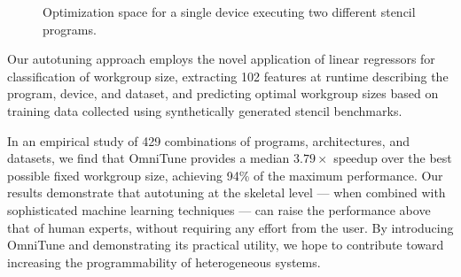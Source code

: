 \documentclass[times, 10pt,twocolumn]{article}
\begin{document}
\begin{figure}
{\begin{minipage}{.48\textwidth}
\begin{subfigure}[h]{.48\columnwidth}
      \vspace{-2em} %
      \caption{}
      \label{fig:motivation-4}
    \end{subfigure}
    \caption{%
      Optimization space for a single device executing two different
      stencil programs.%
    }
    \label{fig:motivation-prog}
  \end{minipage}%
}
\vspace{-1.5em}
\end{figure}

Our autotuning approach employs the novel application of linear
regressors for classification of workgroup size, extracting 102
features at runtime describing the program, device, and dataset, and
predicting optimal workgroup sizes based on training data collected
using synthetically generated stencil benchmarks.

In an empirical study of 429 combinations of programs, architectures,
and datasets, we find that OmniTune provides a median $3.79\times$
speedup over the best possible fixed workgroup size, achieving 94\% of
the maximum performance. Our results demonstrate that autotuning at
the skeletal level --- when combined with sophisticated machine
learning techniques --- can raise the performance above that of human
experts, without requiring any effort from the user. By introducing
OmniTune and demonstrating its practical utility, we hope to
contribute toward increasing the programmability of heterogeneous
systems.

\vspace{-1em}
\printbibliography
\end{document}
